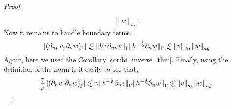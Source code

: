 \begin{proof}
\begin{enumerate}[label=\arabic*)]
\[             \| w  \|_{ a_{h} }^{  }.
             \]
              Now it remains to handle boundary terms. \[
                \left\lvert  ( \partial _{nn} v, \partial _{n} w)_{\Gamma }  \right\rvert  \lesssim \| h^{\frac{1}{2}}\partial _{nn} v \|_{\Gamma   }^{  } \| h^{-\frac{1}{2}} \partial _{n}w \|_{\Gamma   }^{  }  \lesssim \|  v \|_{A_{h}  }^{  } \| w \|_{ a_{h}   }^{  }
             \]
             Again, here we used the Corollary \ref{cor:bi_inverse_thm}.
             Finally, using the definition of the norm is it easily to see that,
             \[
\frac{\gamma }{h} \left\lvert  \left(  \partial _{n} v,  \partial _{n} w \right)_{\Gamma }   \right\rvert \lesssim \gamma  \| h^{-\frac{1}{2}} \partial _{n} v \|_{  \Gamma }^{  } \| h^{-\frac{1}{2}} \partial _{n} w \|_{\Gamma   }^{  } \lesssim \| v \|_{ a_{h} }^{  }
\| w \|_{ a_{h} }^{  } .
             \]


\end{enumerate}
\end{proof}
